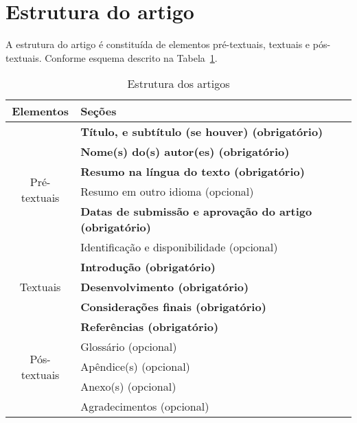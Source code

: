 \section{Estrutura do artigo}

A estrutura do artigo é constituída de elementos pré-textuais, textuais e pós-textuais. Conforme esquema descrito na Tabela~\ref{tbl1}.

\begin{table}[h]
	\centering
	\label{tbl1}
	\caption{Estrutura dos artigos}
	\begin{tabularx}{\textwidth}{cX} \toprule
		Elementos & Seções \\ \midrule
		\multirow{6}{*}{Pré-textuais} & \textbf{Título, e subtítulo (se houver) (obrigatório)} \\
		& \textbf{Nome(s) do(s) autor(es) (obrigatório)} \\ 
		& \textbf{Resumo na língua do texto (obrigatório)} \\
		& Resumo em outro idioma (opcional) \\
		& \textbf{Datas de submissão e aprovação do artigo (obrigatório)} \\
		& Identificação e disponibilidade (opcional) \\ \midrule
		\multirow{3}{*}{Textuais} & \textbf{Introdução (obrigatório)} \\ 
		& \textbf{Desenvolvimento (obrigatório)} \\ 
		& \textbf{Considerações finais (obrigatório)} \\ \midrule
		\multirow{5}{*}{Pós-textuais} & \textbf{Referências (obrigatório)} \\
		& Glossário (opcional) \\
		& Apêndice(s) (opcional) \\
		& Anexo(s) (opcional) \\
		& Agradecimentos (opcional)  \\ \bottomrule
	\end{tabularx} 
\end{table}